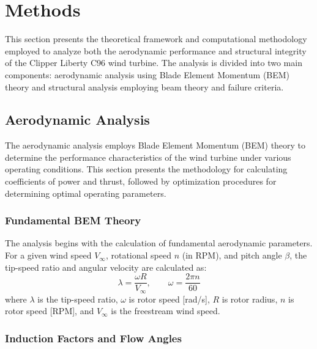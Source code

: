 \documentclass[11pt]{article}
\begin{document}
\section{Methods}

This section presents the theoretical framework and computational methodology employed to analyze both the aerodynamic performance and structural integrity of the Clipper Liberty C96 wind turbine. The analysis is divided into two main components: aerodynamic analysis using Blade Element Momentum (BEM) theory and structural analysis employing beam theory and failure criteria.


\subsection{Aerodynamic Analysis}

The aerodynamic analysis employs Blade Element Momentum (BEM) theory to determine the performance characteristics of the wind turbine under various operating conditions. This section presents the methodology for calculating coefficients of power and thrust, followed by optimization procedures for determining optimal operating parameters.

\subsubsection{Fundamental BEM Theory}

The analysis begins with the calculation of fundamental aerodynamic parameters. For a given wind speed $V_\infty$, rotational speed $n$ (in RPM), and pitch angle $\beta$, the tip-speed ratio and angular velocity are calculated as:
\begin{equation}
\lambda = \frac{\omega R}{V_\infty}, \qquad \omega = \frac{2\pi n}{60}
\label{eq:tsr_omega}
\end{equation}
where $\lambda$ is the tip-speed ratio, $\omega$ is rotor speed [rad/s], $R$ is rotor radius, $n$ is rotor speed [RPM], and $V_\infty$ is the freestream wind speed.

\subsubsection{Induction Factors and Flow Angles}
\end{document}
